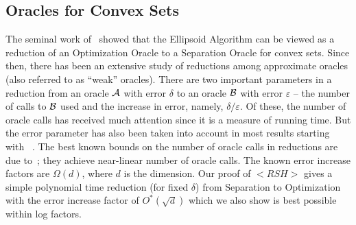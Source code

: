 \documentclass[11pt,letterpaper]{article}
\def\\{}%
\def\mathsf#1{<#1>}%
\def\xspace{}%
\def\Cref#1{<Label:#1>}%
\def\eqref#1{<Eq.:#1>}%
\theoremstyle{definition}
\theoremstyle{remark}
\newcommand{\rsh}{{\mathsf {RSH}}\xspace}
\begin{document}

\noindent
\subsection{Oracles for Convex Sets} 
The seminal work of~\cite{GLS1988} showed that the Ellipsoid Algorithm can be viewed as a reduction of an Optimization Oracle 
to a Separation Oracle for convex sets. Since then, there has been an extensive study of reductions among approximate oracles (also referred to as ``weak'' oracles).
There are two important parameters in a reduction from an oracle ${\cal A}$ with error $\delta$ to an oracle ${\cal B}$ with error $\varepsilon$ --  the number of calls to ${\cal B}$ used and the increase in error, namely, $\delta/\varepsilon$. Of these, the number of oracle calls has received much attention
since it is a measure of running time.
But the error parameter has also been taken into account in most results starting with ~\cite{GLS1988}. The best known bounds on the number of oracle calls in reductions are due to~\cite{LeeSV18}; they achieve near-linear number of oracle calls. The known error increase factors are $\Omega(d)$, where $d$ is the dimension. Our proof of $\rsh$ gives a 
simple polynomial time reduction (for fixed $\delta$) from Separation to Optimization
with the error increase factor of $O^*(\sqrt d)$ which we also show is best possible within log factors.
\end{document}
